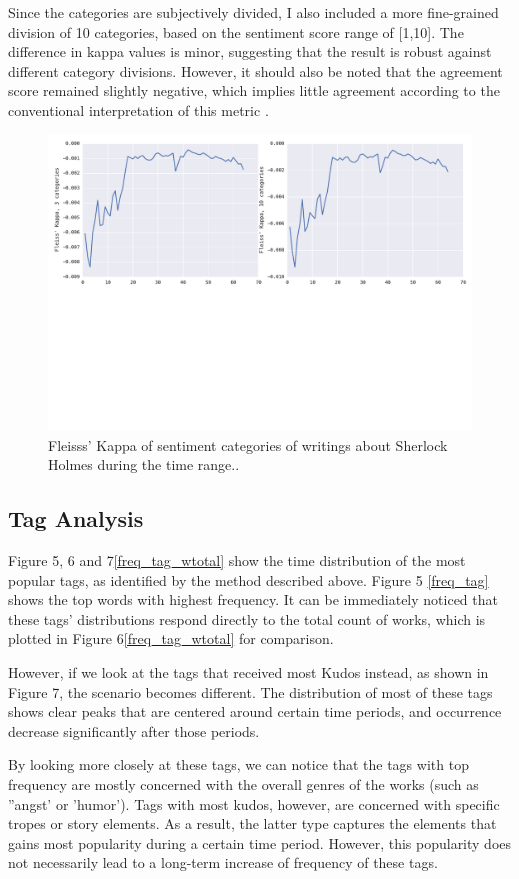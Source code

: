 \documentclass{pnastwo}
\begin{document}
\begin{article}
Since the categories are subjectively divided, I also included a more fine-grained division of 10 categories, based on the sentiment score range of [1,10]. The difference in kappa values is minor, suggesting that the result is robust against different category divisions. However, it should also be noted that the agreement score remained slightly negative, which implies little agreement according to the conventional interpretation of this metric \cite{wiki:fleisskappa}. 


\begin{figure}
\centerline{\includegraphics[width=.5\textwidth]{fleiss_kappa_3_10_categories.pdf}}
\caption{Fleisss' Kappa of sentiment categories of writings about Sherlock Holmes during the time range..}\label{fleiss}
\end{figure}


\subsection{Tag Analysis} Figure 5, 6 and 7\ref{freq_tag_wtotal} show the time distribution of the most popular tags, as identified by the method described above.  Figure 5 \ref{freq_tag} shows the top words with highest frequency. It can be immediately noticed that these tags' distributions respond directly to the total count of works, which is plotted in Figure 6\ref{freq_tag_wtotal} for comparison.

However, if we look at the tags that received most Kudos instead, as shown in Figure 7, the scenario becomes different. The distribution of most of these tags shows clear peaks that are centered around certain time periods, and occurrence decrease significantly after those periods. 

By looking more closely at these tags, we can notice that the tags with top frequency are mostly concerned with the overall genres of the works (such as ''angst' or 'humor'). Tags with most kudos, however, are concerned with specific tropes or story elements. As a result, the latter type captures the elements that gains most popularity during a certain time period. However, this popularity does not necessarily lead to a long-term increase of frequency of these tags.   


\end{article}
\end{document}
